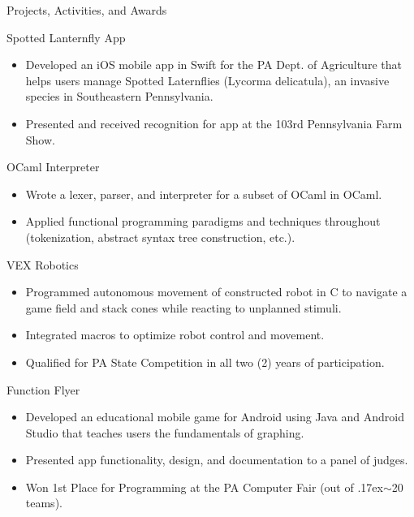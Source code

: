 \documentclass{article}
\newlength{\tabin}
\newlength{\secsep}
\newcommand{\lineunder}{\vspace*{-8pt} \\ \hspace*{-6pt} \hrulefill \\ \vspace*{-15pt}}
\newenvironment{tabbedsection}[1]{
  \begin{list}{}{
      \setlength{\itemsep}{0pt}
      \setlength{\labelsep}{0pt}
      \setlength{\labelwidth}{0pt}
      \setlength{\leftmargin}{\tabin}
      \setlength{\rightmargin}{\tabin}
      \setlength{\listparindent}{0pt}
      \setlength{\parsep}{0pt}
      \setlength{\parskip}{0pt}
      \setlength{\partopsep}{0pt}
      \setlength{\topsep}{#1}
    }
  \item[]
}{\end{list}}
\newenvironment{resume_section}[1]{
  \filbreak
  \vspace{2\secsep}
  \textsc{\large#1}
  \lineunder
  \begin{tabbedsection}{\secsep}
}{\end{tabbedsection}}
\newenvironment{resume_subsection}[2][]{
  \textbf{#2} \hfill {\footnotesize #1} \hspace{-4em}
  \begin{tabbedsection}{0.5\secsep}
}{\end{tabbedsection}}
\newenvironment{subitems}{
  \renewcommand{\labelitemi}{-}
  \begin{itemize}
      \setlength{\labelsep}{1em}
}{\end{itemize}}
\begin{document}
\begin{resume_section}{Projects, Activities, and Awards}
  \begin{resume_subsection}{Spotted Lanternfly App}
  \begin{subitems}
    \item Developed an iOS mobile app in Swift for the PA Dept. of Agriculture that helps users manage Spotted Laternflies (Lycorma delicatula), an invasive species in Southeastern Pennsylvania.
    \item Presented and received recognition for app at the 103rd Pennsylvania Farm Show. 
    \end{subitems}
  \end{resume_subsection}
  
  \begin{resume_subsection}[(Nov. 2021)]{OCaml Interpreter}
  \begin{subitems}
    \item Wrote a lexer, parser, and interpreter for a subset of OCaml in OCaml.
    \item Applied functional programming paradigms and techniques throughout (tokenization, abstract syntax tree construction, etc.). 
    \end{subitems}
  \end{resume_subsection}

  \begin{resume_subsection}{VEX Robotics}
  \begin{subitems}
    \item Programmed autonomous movement of constructed robot in C to navigate a game field and stack cones while reacting to unplanned stimuli.
    \item Integrated macros to optimize robot control and movement.
   	\item Qualified for PA State Competition in all two (2) years of participation.
    \end{subitems}
  \end{resume_subsection}
  
  \begin{resume_subsection}{Function Flyer}
    \begin{subitems}
    \item Developed an educational mobile game for Android using Java and Android Studio that teaches users the fundamentals of graphing.
    \item Presented app functionality, design, and documentation to a panel of judges.
    \item Won 1st Place for Programming at the PA Computer Fair (out of {\raise.17ex\hbox{$\scriptstyle\mathtt{\sim}$}}20 teams).
    \end{subitems}
  \end{resume_subsection}
\end{resume_section}
\end{document}
